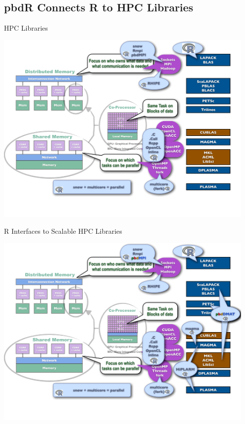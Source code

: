 \subsection{pbdR Connects R to HPC Libraries}
\makesubcontentsslidessec


\begin{frame}
\begin{block}{HPC Libraries}
    
\includegraphics[width=0.95\textwidth]
{../common/pics/hardware/ParallelHardware11.pdf}
\end{block}
\end{frame}

\begin{frame}
\begin{block}{R Interfaces to Scalable HPC Libraries}
    
\includegraphics[width=0.95\textwidth]
{../common/pics/hardware/ParallelHardware12.pdf}
\end{block}
\end{frame}

